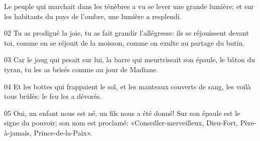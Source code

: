 Le peuple qui marchait dans les ténèbres a vu se lever une grande lumière; et sur les habitants du pays de l’ombre, une lumière a resplendi.

02 Tu as prodigué la joie, tu as fait grandir l’allégresse: ils se réjouissent devant toi, comme on se réjouit de la moisson, comme on exulte au partage du butin.

03 Car le joug qui pesait sur lui, la barre qui meurtrissait son épaule, le bâton du tyran, tu les as brisés comme au jour de Madiane.

04 Et les bottes qui frappaient le sol, et les manteaux couverts de sang, les voilà tous brûlés: le feu les a dévorés.

05 Oui, un enfant nous est né, un fils nous a été donné! Sur son épaule est le signe du pouvoir; son nom est proclamé: «Conseiller-merveilleux, Dieu-Fort, Père-à-jamais, Prince-de-la-Paix».